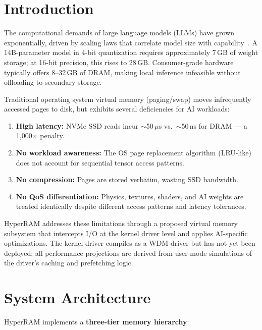 \documentclass[11pt,a4paper]{article}
\newcommand{\micro}{$\mu$}
\begin{document}
\section{Introduction}
\label{sec:introduction}

The computational demands of large language models (LLMs) have grown exponentially, driven by scaling laws that correlate model size with capability~\cite{kaplan2020scaling}. A 14B-parameter model in 4-bit quantization requires approximately 7\,GB of weight storage; at 16-bit precision, this rises to 28\,GB. Consumer-grade hardware typically offers 8--32\,GB of DRAM, making local inference infeasible without offloading to secondary storage.

Traditional operating system virtual memory (paging/swap) moves infrequently accessed pages to disk, but exhibits several deficiencies for AI workloads:

\begin{enumerate}[nosep]
    \item \textbf{High latency:} NVMe SSD reads incur $\sim$50\,\micro{}s vs.~$\sim$50\,ns for DRAM --- a 1{,}000$\times$ penalty.
    \item \textbf{No workload awareness:} The OS page replacement algorithm (LRU-like) does not account for sequential tensor access patterns.
    \item \textbf{No compression:} Pages are stored verbatim, wasting SSD bandwidth.
    \item \textbf{No QoS differentiation:} Physics, textures, shaders, and AI weights are treated identically despite different access patterns and latency tolerances.
\end{enumerate}

HyperRAM addresses these limitations through a proposed virtual memory subsystem that intercepts I/O at the kernel driver level and applies AI-specific optimizations. The kernel driver compiles as a WDM driver but has not yet been deployed; all performance projections are derived from user-mode simulations of the driver's caching and prefetching logic.

\section{System Architecture}
\label{sec:architecture}

HyperRAM implements a \textbf{three-tier memory hierarchy}:
\end{document}
